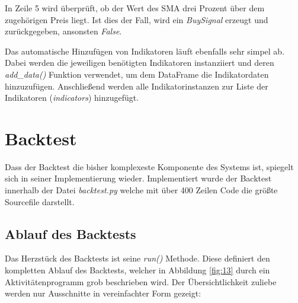 \documentclass[oneside]{ausarbeitung}
\begin{document}
In Zeile 5 wird überprüft, ob der Wert des SMA drei Prozent über dem zugehörigen Preis liegt. Ist dies der Fall, wird ein \textit{BuySignal} erzeugt und zurückgegeben, ansonsten \textit{False}.

Das automatische Hinzufügen von Indikatoren läuft ebenfalls sehr simpel ab. Dabei werden die jeweiligen benötigten Indikatoren instanziiert und deren \textit{add\_data()} Funktion verwendet, um dem DataFrame die Indikatordaten hinzuzufügen. Anschließend werden alle Indikatorinstanzen zur Liste der Indikatoren (\textit{indicators}) hinzugefügt.


\section{Backtest}
\label{sec:backtest}

Dass der Backtest die bisher komplexeste Komponente des Systems ist, spiegelt sich in seiner Implementierung wieder. Implementiert wurde der Backtest innerhalb der Datei \textit{backtest.py} welche mit über 400 Zeilen Code die größte Sourcefile darstellt.

\subsection{Ablauf des Backtests}
\label{sub:ablauf_des_backtests}

Das Herzstück des Backtests ist seine \textit{run()} Methode. Diese definiert den kompletten Ablauf des Backtests, welcher in Abbildung \ref{fig:13} durch ein Aktivitätenprogramm grob beschrieben wird. Der Übersichtlichkeit zuliebe werden nur Ausschnitte in vereinfachter Form gezeigt:
\end{document}
